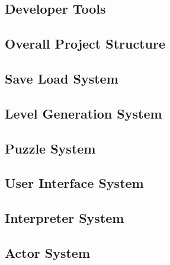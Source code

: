 \subsection{Developer Tools}

\newpage

\subsection{Overall Project Structure}

\newpage

\subsection{Save Load System}

\newpage

\subsection{Level Generation System}

\newpage

\subsection{Puzzle System}

\newpage

\subsection{User Interface System}

\newpage

\subsection{Interpreter System}

\newpage

\subsection{Actor System}

\newpage